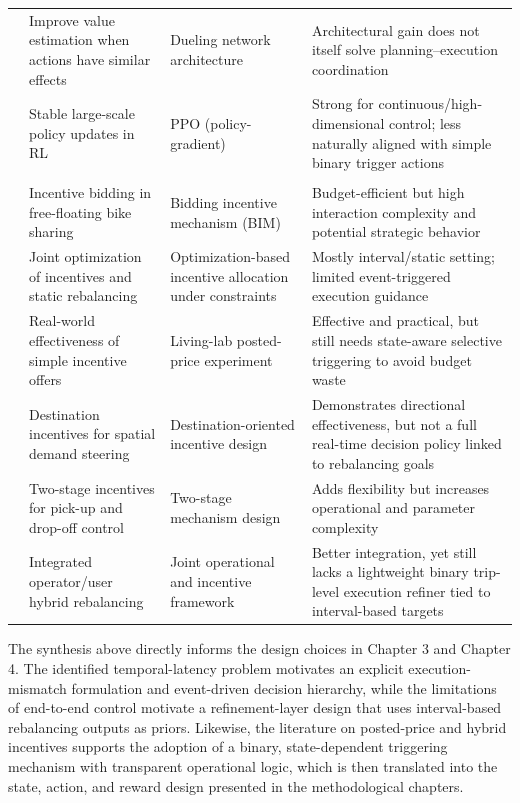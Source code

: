 \begin{table}[p]
\begin{tabularx}{\textwidth}{>{\raggedright\arraybackslash}p{2.2cm}>{\raggedright\arraybackslash}X>{\raggedright\arraybackslash}p{3.0cm}>{\raggedright\arraybackslash}X}
\textcite{wang2016dueling} & Improve value estimation when actions have similar effects & Dueling network architecture & Architectural gain does not itself solve planning--execution coordination \\
\textcite{schulman2017proximal} & Stable large-scale policy updates in RL & PPO (policy-gradient) & Strong for continuous/high-dimensional control; less naturally aligned with simple binary trigger actions \\
\midrule
\multicolumn{4}{l}{\textbf{D. User Incentive Mechanisms and Hybrid Rebalancing}} \\
\midrule
\textcite{cheng2021} & Incentive bidding in free-floating bike sharing & Bidding incentive mechanism (BIM) & Budget-efficient but high interaction complexity and potential strategic behavior \\
\textcite{li2021static} & Joint optimization of incentives and static rebalancing & Optimization-based incentive allocation under constraints & Mostly interval/static setting; limited event-triggered execution guidance \\
\textcite{neijmeijer2020} & Real-world effectiveness of simple incentive offers & Living-lab posted-price experiment & Effective and practical, but still needs state-aware selective triggering to avoid budget waste \\
\textcite{duan2019} & Destination incentives for spatial demand steering & Destination-oriented incentive design & Demonstrates directional effectiveness, but not a full real-time decision policy linked to rebalancing goals \\
\textcite{wang2021two} & Two-stage incentives for pick-up and drop-off control & Two-stage mechanism design & Adds flexibility but increases operational and parameter complexity \\
\textcite{emami2024integrated} & Integrated operator/user hybrid rebalancing & Joint operational and incentive framework & Better integration, yet still lacks a lightweight binary trip-level execution refiner tied to interval-based targets \\
\bottomrule
\end{tabularx}
\normalsize
\end{table}

The synthesis above directly informs the design choices in Chapter 3 and Chapter 4. The identified temporal-latency problem motivates an explicit execution-mismatch formulation and event-driven decision hierarchy, while the limitations of end-to-end control motivate a refinement-layer design that uses interval-based rebalancing outputs as priors. Likewise, the literature on posted-price and hybrid incentives supports the adoption of a binary, state-dependent triggering mechanism with transparent operational logic, which is then translated into the state, action, and reward design presented in the methodological chapters.
